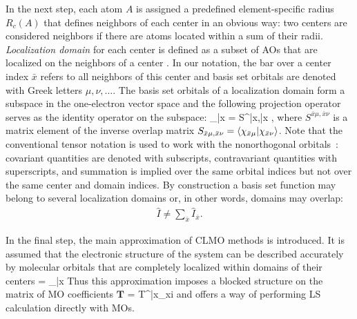 \documentclass[aps,prl,twocolumn,reprint,amsmath,amssymb]{revtex4-1}
\begin{document}
In the next step, each atom $A$ is assigned a predefined element-specific radius $R_c(A)$ that defines neighbors of each center in an obvious way: two centers are considered neighbors if there are atoms located within a sum of their radii. 
\emph{Localization domain} for each center is defined as a subset of AOs that are localized on the neighbors of a center . In our notation, the bar over a center index $\bar{x}$ refers to all neighbors of this center and basis set orbitals are denoted with Greek letters $\mu,\nu,\ldots$. The basis set orbitals of a localization domain form a subspace in the one-electron vector space and the following projection operator serves as the identity operator on the subspace:
%
\bea
{}_{\bar{x}} =  S^{\bar{x}\mu,\bar{x}\nu} ,
\eea
%
where $S^{\bar{x}\mu,\bar{x}\nu}$ is a matrix element of the inverse overlap matrix $S_{\bar{x}\mu,\bar{x}\nu} = \langle  \chi_{\bar{x}\mu} \vert  \chi_{\bar{x}\nu} \rangle $. Note that the conventional tensor notation is used to work with the nonorthogonal orbitals~\cite{head1998tensor}: covariant quantities are denoted with subscripts, contravariant quantities with superscripts, and summation is implied over the same orbital indices but not over the same center and domain indices.
%
By construction a basis set function may belong to several localization domains or, in other words, domains may overlap:
%
\begin{eqnarray}
\label{eq:span}
\hat{I} \neq \sum_{\bar{x}} \hat{I}_{\bar{x}}.
\end{eqnarray}

In the final step, the main approximation of CLMO methods is introduced. It is assumed that the electronic structure of the system can be described accurately by molecular orbitals that are completely localized within domains of their centers
%
\bea
{} = _{\bar{x}} 
\label{eq:LMO}
\eea
%
Thus this approximation imposes a blocked structure on the matrix of MO coefficients $\mathbf{T}$
%
\bea
{} =  {T^{\bar{x}\mu}}_{xi}
\label{eq:LMOproj}
\eea
%
and offers a way of performing LS calculation directly with MOs. %
\end{document}
